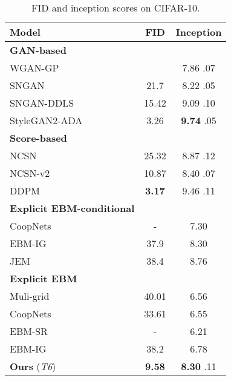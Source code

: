 \documentclass{article} \usepackage{iclr2021_conference,times}
\begin{document}
\begin{center}
\begin{minipage}[c]{.55\textwidth}
\begin{table}[H]
\centering
 \caption{FID and inception scores on CIFAR-10. } 
 \footnotesize
 \setlength\tabcolsep{3.0pt}
 \begin{tabular}{lcc}
    \toprule
    Model & FID & Inception  \\
        \midrule
{\bf GAN-based} & & \\
      \midrule
      WGAN-GP~\citep{gulrajani2017improved} &  & 7.86  .07 \\
      SNGAN~\citep{miyato2018spectral} & 21.7 & 8.22  .05 \\
      SNGAN-DDLS~\citep{che2020your} & 15.42 & 9.09  .10 \\
      StyleGAN2-ADA~\citep{karras2020training} & 3.26 & {\bf 9.74}  .05 \\
      \midrule
      {\bf Score-based} & &\\
      \midrule
      NCSN~\citep{song2019generative} & 25.32 & 8.87  .12 \\
      NCSN-v2~\citep{song2020improved} & 10.87 & 8.40  .07 \\
      DDPM~\citep{ho2020denoising} & {\bf 3.17} & 9.46  .11\\
    \midrule 
      {\bf Explicit EBM-conditional} & & \\
      \midrule
      CoopNets~\citep{xie2019cooperative} & - & 7.30 \\
      EBM-IG~\citep{du2019implicit} & 37.9 & 8.30 \\
      JEM~\citep{grathwohl2019your} & 38.4 & 8.76 \\
      \midrule
      {\bf Explicit EBM} & & \\
      \midrule
           Muli-grid~\citep{gao2018learning} & 40.01 & 6.56\\
      CoopNets~\citep{xie2016cooperative} & 33.61 & 6.55 \\
      EBM-SR~\citep{nijkamp2019learning} & - & 6.21 \\
      EBM-IG~\citep{du2019implicit} & 38.2 & 6.78 \\
{\bf Ours} ({\em T6}) & {\bf 9.58} & {\bf 8.30}  .11 \\ 
        \bottomrule 
    \end{tabular}
    \label{tabl: fid}
\end{table}
\end{minipage}
\begin{minipage}[c]{.44\textwidth}

\end{minipage}
\end{center}
\end{document}

